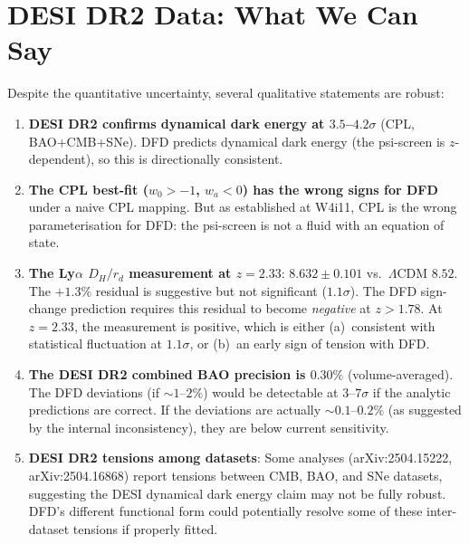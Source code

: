 \documentclass[11pt,a4paper]{article}
\newcommand{\LCDM}{$\Lambda$CDM}
\begin{document}
\section{DESI DR2 Data: What We Can Say}
\label{sec:DESI-data}

Despite the quantitative uncertainty, several qualitative statements
are robust:

\begin{enumerate}
\item \textbf{DESI DR2 confirms dynamical dark energy at $3.5$--$4.2\sigma$}
  (CPL, BAO+CMB+SNe).  DFD predicts dynamical dark energy (the psi-screen
  is $z$-dependent), so this is directionally consistent.

\item \textbf{The CPL best-fit ($w_0 > -1$, $w_a < 0$) has the wrong
  signs for DFD} under a naive CPL mapping.  But as established at W4i11,
  CPL is the wrong parameterisation for DFD: the psi-screen is not a
  fluid with an equation of state.

\item \textbf{The Ly$\alpha$ $D_H/r_d$ measurement at $z = 2.33$}:
  $8.632 \pm 0.101$ vs.\ \LCDM{} $8.52$.  The $+1.3\%$ residual is
  suggestive but not significant ($1.1\sigma$).  The DFD sign-change
  prediction requires this residual to become \emph{negative} at
  $z > 1.78$.  At $z = 2.33$, the measurement is positive, which is
  either (a)~consistent with statistical fluctuation at $1.1\sigma$,
  or (b)~an early sign of tension with DFD.

\item \textbf{The DESI DR2 combined BAO precision is $0.30\%$}
  (volume-averaged).  The DFD deviations (if $\sim 1$--$2\%$) would
  be detectable at $3$--$7\sigma$ if the analytic predictions are
  correct.  If the deviations are actually $\sim 0.1$--$0.2\%$ (as
  suggested by the internal inconsistency), they are below current
  sensitivity.

\item \textbf{DESI DR2 tensions among datasets}: Some analyses
  (arXiv:2504.15222, arXiv:2504.16868) report tensions between CMB,
  BAO, and SNe datasets, suggesting the DESI dynamical dark energy
  claim may not be fully robust.  DFD's different functional form
  could potentially resolve some of these inter-dataset tensions if
  properly fitted.
\end{enumerate}


\end{document}
